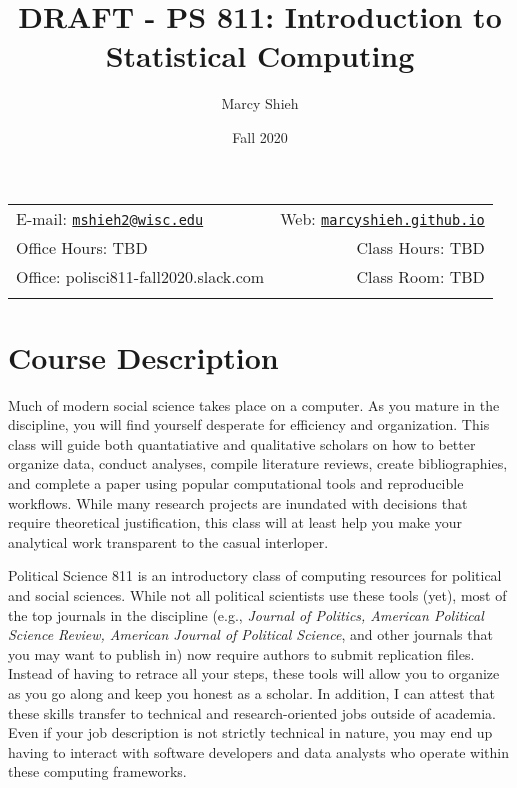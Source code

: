 \documentclass[11pt,]{article}
\title{DRAFT - PS 811: Introduction to Statistical Computing}
\author{Marcy Shieh}
\date{Fall 2020}
\begin{document}
  

		\maketitle
		
	
		\thispagestyle{firststyle}



	\noindent \begin{tabular*}{\textwidth}{ @{\extracolsep{\fill}} lr @{\extracolsep{\fill}}}


E-mail: \texttt{\href{mailto:mshieh2@wisc.edu}{\nolinkurl{mshieh2@wisc.edu}}} & Web: \href{http://marcyshieh.github.io}{\tt marcyshieh.github.io}\\
Office Hours: TBD  &  Class Hours: TBD\\
Office: polisci811-fall2020.slack.com  & Class Room: TBD\\
	&  \\
	\hline
	\end{tabular*}
	
\vspace{2mm}
	


\hypertarget{course-description}{%
\section{Course Description}\label{course-description}}

Much of modern social science takes place on a computer. As you mature
in the discipline, you will find yourself desperate for efficiency and
organization. This class will guide both quantatiative and qualitative
scholars on how to better organize data, conduct analyses, compile
literature reviews, create bibliographies, and complete a paper using
popular computational tools and reproducible workflows. While many
research projects are inundated with decisions that require theoretical
justification, this class will at least help you make your analytical
work transparent to the casual interloper.

Political Science 811 is an introductory class of computing resources
for political and social sciences. While not all political scientists
use these tools (yet), most of the top journals in the discipline (e.g.,
\emph{Journal of Politics, American Political Science Review, American
Journal of Political Science}, and other journals that you may want to
publish in) now require authors to submit replication files. Instead of
having to retrace all your steps, these tools will allow you to organize
as you go along and keep you honest as a scholar. In addition, I can
attest that these skills transfer to technical and research-oriented
jobs outside of academia. Even if your job description is not strictly
technical in nature, you may end up having to interact with software
developers and data analysts who operate within these computing
frameworks.
\end{document}
